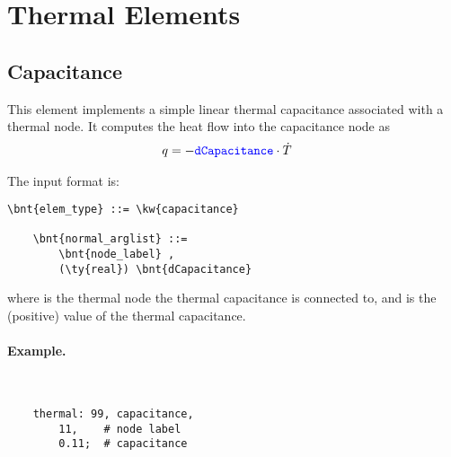 %
%
%
%
%
%
%
%

\section{Thermal Elements}
\label{sec:EL:THERMO}

\subsection{Capacitance}
\label{sec:EL:THERMO:CAPACITANCE}

This element implements a simple linear thermal capacitance associated with a thermal node.
It computes the heat flow into the capacitance node as
\begin{align*}
	q &= -\textcolor{blue}{\texttt{dCapacitance}} \cdot \dot{T}
\end{align*}

The input format is:
\begin{Verbatim}[commandchars=\\\{\}]
    \bnt{elem_type} ::= \kw{capacitance}

    \bnt{normal_arglist} ::= 
        \bnt{node_label} , 
        (\ty{real}) \bnt{dCapacitance}
\end{Verbatim}
where  is the thermal node the thermal capacitance is connected to, and  is the (positive) value of the thermal capacitance.

\paragraph{Example.} \
\begin{verbatim}
    thermal: 99, capacitance,
        11,    # node label
        0.11;  # capacitance
\end{verbatim}



